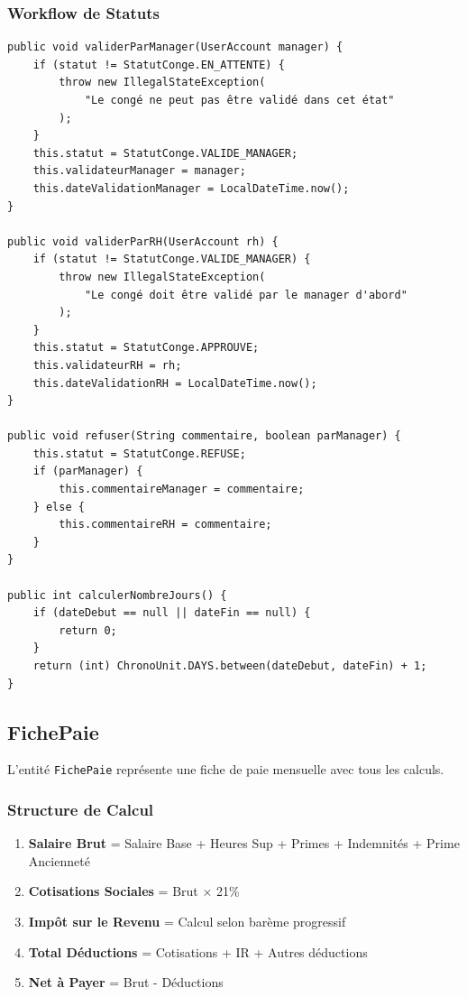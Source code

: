\documentclass[12pt,a4paper,twoside]{report}
\begin{document}
\subsubsection{Workflow de Statuts}

\begin{lstlisting}[caption=Méthodes de workflow, label=lst:conge-workflow]
public void validerParManager(UserAccount manager) {
    if (statut != StatutConge.EN_ATTENTE) {
        throw new IllegalStateException(
            "Le congé ne peut pas être validé dans cet état"
        );
    }
    this.statut = StatutConge.VALIDE_MANAGER;
    this.validateurManager = manager;
    this.dateValidationManager = LocalDateTime.now();
}

public void validerParRH(UserAccount rh) {
    if (statut != StatutConge.VALIDE_MANAGER) {
        throw new IllegalStateException(
            "Le congé doit être validé par le manager d'abord"
        );
    }
    this.statut = StatutConge.APPROUVE;
    this.validateurRH = rh;
    this.dateValidationRH = LocalDateTime.now();
}

public void refuser(String commentaire, boolean parManager) {
    this.statut = StatutConge.REFUSE;
    if (parManager) {
        this.commentaireManager = commentaire;
    } else {
        this.commentaireRH = commentaire;
    }
}

public int calculerNombreJours() {
    if (dateDebut == null || dateFin == null) {
        return 0;
    }
    return (int) ChronoUnit.DAYS.between(dateDebut, dateFin) + 1;
}
\end{lstlisting}

\subsection{FichePaie}

L'entité \texttt{FichePaie} représente une fiche de paie mensuelle avec tous les calculs.

\subsubsection{Structure de Calcul}

\begin{enumerate}
    \item \textbf{Salaire Brut} = Salaire Base + Heures Sup + Primes + Indemnités + Prime Ancienneté
    \item \textbf{Cotisations Sociales} = Brut × 21\%
    \item \textbf{Impôt sur le Revenu} = Calcul selon barème progressif
    \item \textbf{Total Déductions} = Cotisations + IR + Autres déductions
    \item \textbf{Net à Payer} = Brut - Déductions
\end{enumerate}
\end{document}
